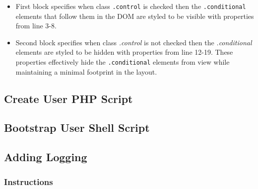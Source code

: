 \begin{itemize}
    \item First block specifies when class \texttt{.control} is checked then the
    \texttt{.conditional} elements that follow them in the DOM are styled to be
    visible with properties from line 3-8. 
    \item Second block specifies when class \textit{.control} is not checked
    then the \textit{.conditional} elements are styled to be hidden with
    properties from line 12-19. These properties effectively hide the
    \texttt{.conditional} elements from view while maintaining a minimal
    footprint in the
    layout.
\end{itemize}

\subsection{Create User PHP Script}





\subsection{Bootstrap User Shell Script}

% 

\subsection{Adding Logging}\label{section:logging}

\subsubsection*{Instructions}

